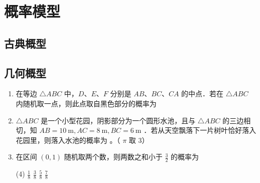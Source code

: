 \section{概率模型}

\subsection{古典概型}

\subsection{几何概型}

\begin{enumerate}
    \item 在等边 $\triangle A B C$ 中，$D$、$E$、$F$ 分别是 $A B$、$B C$、$C A$ 的中点．若在 $\triangle A B C$ 内随机取一点，则此点取自黑色部分的概率为 \underline{\hspace{2cm}}

    \item $\triangle A B C$ 是一个小型花园，阴影部分为一个圆形水池，且与 $\triangle A B C$ 的三边相切，知 $A B=10 \mathrm{~m}, A C=8 \mathrm{~m}, B C=6 \mathrm{~m}$ ．若从天空飘落下一片树叶恰好落入花园里，则落入水池的概率为 \underline{\hspace{2cm}} 。（ $\pi$ 取 3）

    \item 在区间 $(0,1)$ 随机取两个数，则两数之和小于 $\frac{3}{2}$ 的概率为
          \begin{tasks}(4)
              \task $\frac{1}{8}$
              \task $\frac{3}{8}$
              \task $\frac{5}{8}$
              \task $\frac{7}{8}$
          \end{tasks}
\end{enumerate}


